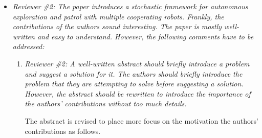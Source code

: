 \documentclass[11pt]{article}
\begin{document}
\begin{itemize}\setlength{\itemsep}{2\parsep}


\item {\itshape Reviewer \#2: The paper introduces a stochastic framework for autonomous exploration and patrol with multiple cooperating robots. Frankly, the contributions of the authors sound interesting.  The paper is mostly well-written and easy to understand. However, the following comments have to be addressed:}

\begin{enumerate}\setlength{\itemsep}{2\parsep}

\item {\itshape Reviewer \#2: A well-written abstract should briefly introduce a problem and suggest a solution for it. The authors should briefly introduce the problem that they are attempting to solve before suggesting a solution. However,  the abstract should be rewritten to introduce the importance of the authors' contributions without too much details.}

The abstract is revised to place more focus on the motivation the authors' contributions as follows.


\end{enumerate}
\end{itemize}
\end{document}
